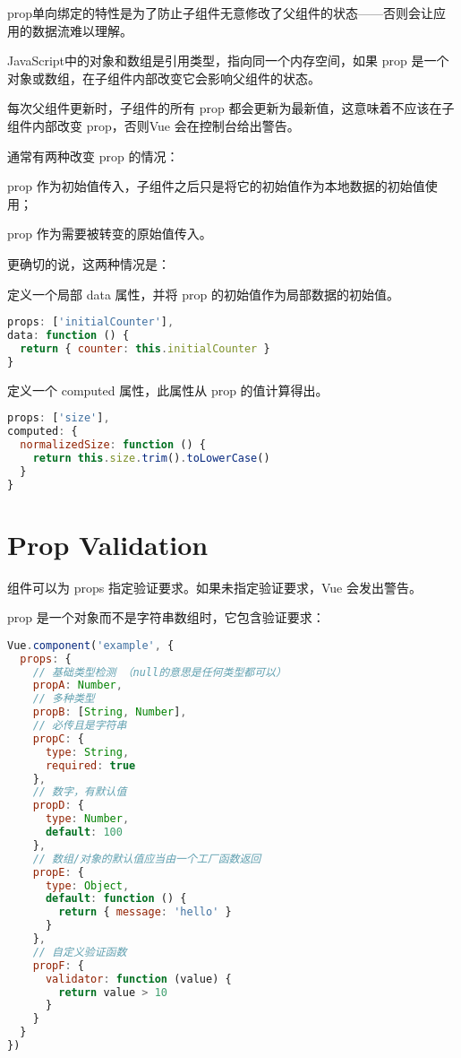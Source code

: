 prop单向绑定的特性是为了防止子组件无意修改了父组件的状态——否则会让应用的数据流难以理解。

JavaScript中的对象和数组是引用类型，指向同一个内存空间，如果 prop 是一个对象或数组，在子组件内部改变它会影响父组件的状态。

每次父组件更新时，子组件的所有 prop 都会更新为最新值，这意味着不应该在子组件内部改变 prop，否则Vue 会在控制台给出警告。



通常有两种改变 prop 的情况：

\begin{compactenum}
\item prop 作为初始值传入，子组件之后只是将它的初始值作为本地数据的初始值使用；
\item prop 作为需要被转变的原始值传入。
\end{compactenum}

更确切的说，这两种情况是：

\begin{compactenum}
\item 定义一个局部 data 属性，并将 prop 的初始值作为局部数据的初始值。

\begin{lstlisting}[language=JavaScript]
props: ['initialCounter'],
data: function () {
  return { counter: this.initialCounter }
}
\end{lstlisting}

\item 定义一个 computed 属性，此属性从 prop 的值计算得出。

\begin{lstlisting}[language=JavaScript]
props: ['size'],
computed: {
  normalizedSize: function () {
    return this.size.trim().toLowerCase()
  }
}
\end{lstlisting}


\end{compactenum}



\section{Prop Validation}

组件可以为 props 指定验证要求。如果未指定验证要求，Vue 会发出警告。


prop 是一个对象而不是字符串数组时，它包含验证要求：



\begin{lstlisting}[language=JavaScript]
Vue.component('example', {
  props: {
    // 基础类型检测 （null的意思是任何类型都可以）
    propA: Number,
    // 多种类型
    propB: [String, Number],
    // 必传且是字符串
    propC: {
      type: String,
      required: true
    },
    // 数字，有默认值
    propD: {
      type: Number,
      default: 100
    },
    // 数组/对象的默认值应当由一个工厂函数返回
    propE: {
      type: Object,
      default: function () {
        return { message: 'hello' }
      }
    },
    // 自定义验证函数
    propF: {
      validator: function (value) {
        return value > 10
      }
    }
  }
})
\end{lstlisting}

